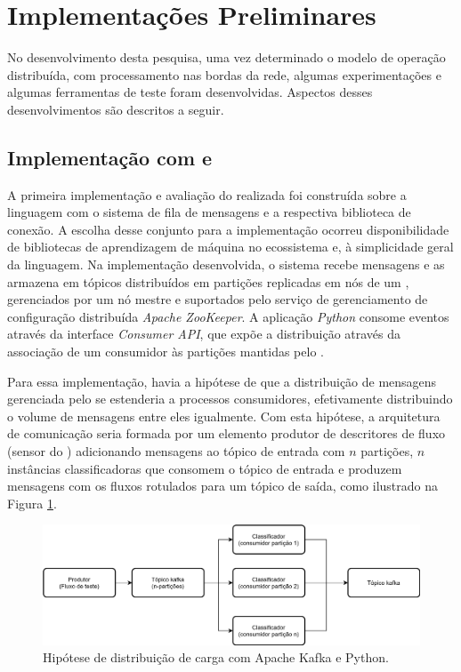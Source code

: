 
\section{Implementações Preliminares}\label{sec:resultados}

No desenvolvimento desta pesquisa, uma vez determinado o modelo de operação
distribuída, com processamento nas bordas da rede, algumas experimentações e
algumas ferramentas de teste foram desenvolvidas. Aspectos desses
desenvolvimentos são descritos a seguir.

\subsection{Implementação com \python e \kafka}

A primeira implementação e avaliação do \mfog realizada foi construída sobre a
linguagem \python com o sistema de fila de mensagens \kafka e a respectiva
biblioteca de conexão.
A escolha desse conjunto para a implementação ocorreu 
disponibilidade de bibliotecas de aprendizagem de máquina no ecossistema
\python e, à simplicidade geral da linguagem.
Na implementação desenvolvida, o sistema \kafka recebe mensagens e as armazena
em tópicos distribuídos em partições replicadas em nós de um \cluster,
gerenciados por um nó mestre e suportados pelo serviço de gerenciamento de
configuração distribuída \emph{Apache ZooKeeper}.
A aplicação \emph{Python} consome eventos através da interface \emph{Consumer API},
que expõe a distribuição através da associação de um consumidor às partições
mantidas pelo \kafka.

Para essa implementação, havia a hipótese de que a distribuição de
mensagens gerenciada pelo \kafka
se estenderia a processos consumidores, efetivamente distribuindo o volume de
mensagens entre eles igualmente.
Com esta hipótese, a arquitetura de comunicação seria formada por um elemento
produtor de descritores de fluxo (sensor do \nids) adicionando mensagens
ao tópico \kafka de entrada com $n$ partições, $n$ instâncias classificadoras
que consomem o tópico de entrada e produzem mensagens com os fluxos rotulados
para um tópico de saída, como ilustrado na Figura \ref{fig:python-kafka}.

\begin{figure}[htb]
    \centerline{
      \includegraphics[width=\linewidth,page=1]{figures/python-kafka.png}
    }
    \caption{Hipótese de distribuição de carga com Apache Kafka e Python.}
    \label{fig:python-kafka}
\end{figure}

